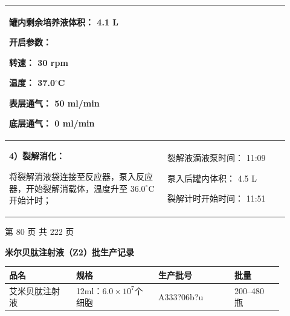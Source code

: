 \documentclass[UTF8,10pt,a4paper,fontset=fandol]{ctexart}
\newcommand{\fieldvalue}[1]{#1}
\newcommand{\handwritten}[1]{#1}
\begin{document}
\begin{tabular}{|p{0.52\linewidth}|p{0.40\linewidth}|}
罐内剩余培养液体积：
\fieldvalue{\handwritten{4.1}} L

开启参数：

转速：
\fieldvalue{\handwritten{30}} rpm

温度：
\fieldvalue{\handwritten{37.0}}$^\circ$C

表层通气：
\fieldvalue{\handwritten{50}} ml/min

底层通气：
\fieldvalue{\handwritten{0}} ml/min
\\
\hline
\textbf{4）裂解消化：}

将裂解消液袋连接至反应器，泵入反应器，开始裂解消载体，温度升至 $36.0^\circ$C 开始计时；
&
裂解液滴液泵时间：
\fieldvalue{\handwritten{11:09}}

泵入后罐内体积：
\fieldvalue{\handwritten{4.5}} L

裂解计时开始时间：
\fieldvalue{\handwritten{11:51}}
\\
\hline
\end{tabular}

\begin{center}
第 80 页 共 222 页
\end{center}

\newpage

\begin{center}
\textbf{米尔贝肽注射液（Z2）批生产记录}
\end{center}

\begin{tabular}{|p{0.22\linewidth}|p{0.27\linewidth}|p{0.25\linewidth}|p{0.16\linewidth}|}
\hline
品名 & 规格 & 生产批号 & 批量 \\
\hline
艾米贝肽注射液 & 12ml：$6.0\times10^{7}$个细胞 &
\fieldvalue{\handwritten{A333?06b?u}} &
200--480 瓶 \\
\hline
\end{tabular}
\end{document}
